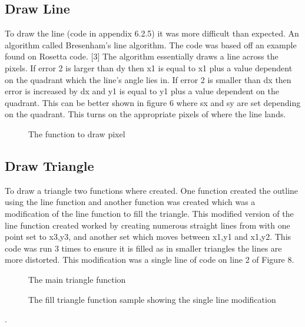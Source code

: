 \documentclass[a4paper,12pt]{article}
\newcommand{\GraphicsC}{../Graphics/Graphics.c}
\begin{document}
\subsection{Draw Line}
\begin{flushleft}
To draw the line (code in appendix 6.2.5) it was more difficult than expected. An algorithm called Bresenham's line algorithm. The code was based off an example found on Rosetta code. [3]  The algorithm essentially draws a line across the pixels. If error 2 is larger than dy then x1 is equal to x1 plus a value dependent on the quadrant which the line's angle lies in. If error 2 is smaller than dx then error is increased by dx and y1 is equal to y1 plus a value dependent on the quadrant. This can be better shown in figure 6 where sx and sy are set depending on the quadrant. This turns on the appropriate pixels of where the line lands.
\end{flushleft}
\begin{figure}[h]
	\centering
	\setlength{\belowcaptionskip}{-15pt}
	
	\caption{The function to draw pixel}
\end{figure}
\subsection{Draw Triangle}
\begin{flushleft}
To draw a triangle two functions where created. One function created the outline using the line function and another function was created which was a modification of the line function to fill the triangle. \newline \newline
This modified version of the line function created worked by creating numerous straight lines from with one point set to x3,y3, and another set which moves between x1,y1 and x1,y2. This code was run 3 times to ensure it is filled as in smaller triangles the lines are more distorted. This modification was a single line of code on line 2 of Figure 8.
\end{flushleft}
\begin{figure}[h]
	\centering
	\setlength{\belowcaptionskip}{-15pt}
	
	\caption{The main triangle function}
\end{figure}
\begin{figure}[h]
	\centering
	\setlength{\belowcaptionskip}{-15pt}
	
	\caption{The fill triangle function sample showing the single line modification}
\end{figure}
\begin{flushleft}
.
\newline
\newline
\end{flushleft}
\end{document}
